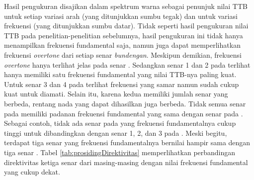 Hasil pengukuran disajikan dalam spektrum warna sebagai penunjuk nilai TTB untuk setiap variasi arah (yang ditunjukkan sumbu tegak) dan untuk variasi frekuensi (yang ditunjukkan sumbu datar). Tidak seperti hasil pengukuran nilai TTB pada penelitian-penelitian sebelumnya, hasil pengukuran ini tidak hanya menampilkan frekuensi fundamental saja, namun juga dapat memperlihatkan frekuensi \textit{overtone} dari setiap senar \textit{bundengan}. Meskipun demikian, frekuensi \textit{overtone} hanya terlihat jelas pada senar . Sedangkan senar 1 dan 2 pada  terlihat hanya memiliki satu frekuensi fundamental yang nilai TTB-nya paling kuat. Untuk senar 3 dan 4 pada  terlihat frekuensi \overtone yang samar namun sudah cukup kuat untuk diamati. Selain itu, karena kedua \bundengan memiliki jumlah senar yang berbeda, rentang nada yang dapat dihasilkan juga berbeda. Tidak semua senar pada  memiliki padanan frekuensi fundamental yang sama dengan senar pada . Sebagai contoh, tidak ada senar pada  yang frekuensi fundamentalnya cukup tinggi untuk dibandingkan dengan senar 1, 2, dan 3 pada . Meski begitu, terdapat tiga senar  yang frekuensi fundamentalnya bernilai hampir sama dengan tiga senar . Tabel \ref{tab:prosidingDirektivitas} memperlihatkan perbandingan direktivitas ketiga senar dari masing-masing \bundengan dengan nilai frekuensi fundamental yang cukup dekat. \par 
